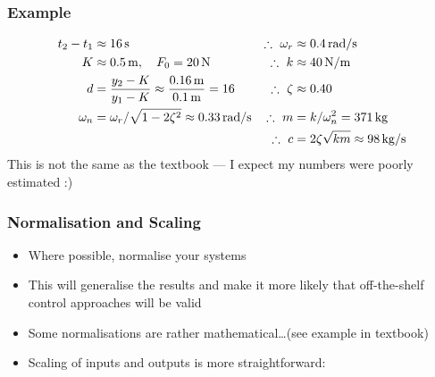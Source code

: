 \documentclass{beamer-control}
\begin{document}
\begin{frame}
\frametitle{Example}
\begin{align}
t_2-t_1&\approx \SI{16}{s} & \therefore~ \omega_r &\approx \SI{0.4}{rad/s} \\
K &\approx \SI{0.5}{m},\quad F_0=\SI{20}{N} & \therefore~ k&\approx \SI{40}{N/m} \\
d&=\frac{y_2-K}{y_1-K}\approx\frac{\SI{0.16}{m}}{\SI{0.1}{m}}=16 & \therefore~ \zeta&\approx0.40  \\
\omega_n &= \omega_r/\sqrt{1-2\zeta^2} \approx \SI{0.33}{rad/s} & \therefore~ m &= k/\omega_n^2 = \SI{371}{kg} \\
&& \therefore~c &= 2\zeta\sqrt{km} \approx \SI{98}{kg/s}
\end{align}
This is not the same as the textbook --- I expect my numbers were poorly estimated :)

\end{frame}



\begin{frame}
\frametitle{Normalisation and Scaling}
\begin{itemize}
\item Where possible, normalise your systems
\item This will generalise the results and make it more likely that off-the-shelf control approaches will be valid
\item Some normalisations are rather mathematical\dots (see example in textbook)
\item Scaling of inputs and outputs is more straightforward:
\end{itemize}
\end{frame}
\end{document}
